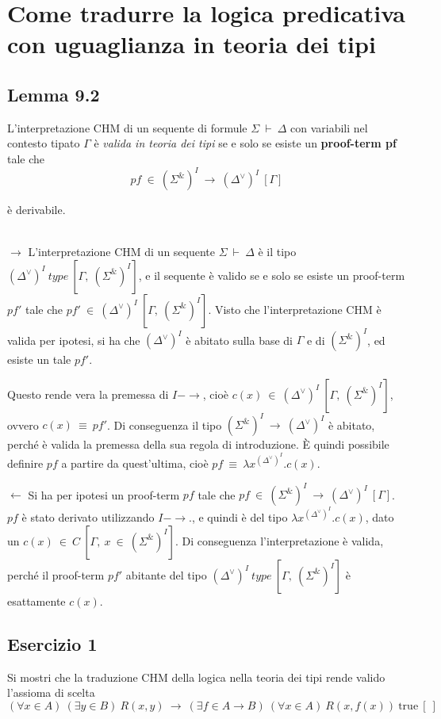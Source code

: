 \newpage
\section{Come tradurre la logica predicativa con uguaglianza in teoria dei tipi}
\subsection{Lemma 9.2}
\begin{lem}
	L'interpretazione CHM di un sequente di formule $\Sigma~\vdash~\Delta$ con variabili nel contesto tipato $\Gamma$ è \textit{valida in teoria dei tipi} se e solo se esiste un \textbf{proof-term pf} tale che 
	\[pf~\in~(\Sigma^{\&})^I~\to~(\Delta^{\vee})^I~[\Gamma]\]
	
	è derivabile.
\end{lem}

\proof \mbox{} \\

$\to$ L'interpretazione CHM di un sequente $\Sigma~\vdash~\Delta$ è il tipo $(\Delta^{\vee})^I~type~[\Gamma,~(\Sigma^{\&})^I]$, e il sequente è valido se e solo se esiste un proof-term $pf'$ tale che 
$pf'~\in~(\Delta^{\vee})^I~[\Gamma,~(\Sigma^{\&})^I]$. Visto che l'interpretazione CHM è valida per ipotesi, si ha che $(\Delta^{\vee})^I$ è abitato sulla base di $\Gamma$ e di $(\Sigma^{\&})^I$, ed esiste un tale $pf'$.

Questo rende vera la premessa di $I-\to$, cioè $c(x)~\in~(\Delta^{\vee})^I~[\Gamma,~(\Sigma^{\&})^I]$, ovvero $c(x)~\equiv~pf'$. Di conseguenza il tipo $(\Sigma^{\&})^I~\to~(\Delta^{\vee})^I$ è abitato, perché è valida la premessa della sua regola di introduzione. È quindi possibile definire $pf$ a partire da quest'ultima, cioè $pf~\equiv~\lambda x^{(\Delta^{\vee})^I}.c(x)$.

\vspace{0.2in}
$\leftarrow$ Si ha per ipotesi un proof-term $pf$ tale che $pf~\in~(\Sigma^{\&})^I~\to~(\Delta^{\vee})^I~[\Gamma]$. $pf$ è stato derivato utilizzando $I-\to$., e quindi è del tipo $\lambda x^{(\Delta^{\vee})^I}.c(x)$, dato un $c(x)~\in~C~[\Gamma,~x~\in~(\Sigma^{\&})^I]$. Di conseguenza l'interpretazione è valida, perché il proof-term $pf'$ abitante del tipo 
$(\Delta^{\vee})^I~type~[\Gamma,~(\Sigma^{\&})^I]$ è esattamente $c(x)$.

\endproof

\subsection{Esercizio 1}
\begin{thm} Si mostri che la traduzione CHM della logica nella teoria dei tipi rende valido l'assioma di scelta
	\[ (\forall x\in A)\ (\exists y\in B)\  R(x, y)\ \to\ (\exists f\in A\to B)\ (\forall x\in A)\ R(x, f(x))\ \mathrm{true}\ [\ ] \]
	
\end{thm}

